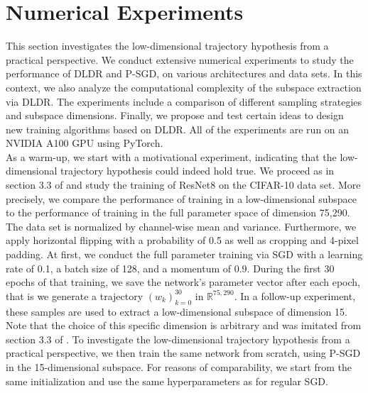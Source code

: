 \documentclass[11pt, a4paper]{article}
\newcommand{\R}{\mathbb{R}}
\begin{document}
\pagebreak
\section{Numerical Experiments} \label{sec:Experiments}

This section investigates the low-dimensional trajectory hypothesis from a practical perspective. We conduct extensive numerical experiments to study the performance of DLDR and P-SGD, on various architectures and data sets. In this context, we also analyze the computational complexity of the subspace extraction via DLDR. The experiments include a comparison of different sampling strategies and subspace dimensions. Finally, we propose and test certain ideas to design new training algorithms based on DLDR. All of the experiments are run on an NVIDIA A100 GPU using PyTorch. \\

As a warm-up, we start with a motivational experiment, indicating that the low-dimensional trajectory hypothesis could indeed hold true. We proceed as in section 3.3 of \cite{Paper} and study the training of ResNet8 \cite{ResNet} on the CIFAR-10 data set. More precisely, we compare the performance of training in a low-dimensional subspace to the performance of training in the full parameter space of dimension 75,290. The data set is normalized by channel-wise mean and variance. Furthermore, we apply horizontal flipping with a probability of 0.5 as well as cropping and 4-pixel padding. At first, we conduct the full parameter training via SGD with a learning rate of 0.1, a batch size of 128, and a momentum of 0.9. During the first 30 epochs of that training, we save the network's parameter vector after each epoch, that is we generate a trajectory $(w_k)_{k=0}^{30}$ in $\R^{75,290}$. In a follow-up experiment, these samples are used to extract a low-dimensional subspace of dimension 15. Note that the choice of this specific dimension is arbitrary and was imitated from section 3.3 of \cite{Paper}. To investigate the low-dimensional trajectory hypothesis from a practical perspective, we then train the same network from scratch, using P-SGD in the 15-dimensional subspace. For reasons of comparability, we start from the same initialization and use the same hyperparameters as for regular SGD.
\end{document}
